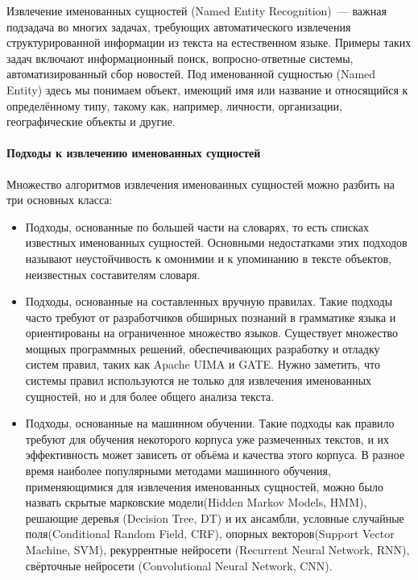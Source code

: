 \documentclass[14pt,russian]{extreport}
\begin{document}
Извлечение именованных сущностей\cite{nadeau2007survey} (Named Entity
Recognition)~--- важная подзадача во многих задачах, требующих автоматического
извлечения структурированной информации из текста на естественном
языке\cite{feldman2007text}. Примеры таких задач включают информационный поиск,
вопросно-ответные системы, автоматизированный сбор новостей. Под именованной
сущностью (Named Entity) здесь мы понимаем объект, имеющий имя или название и
относящийся к определённому типу, такому как, например, личности, организации,
географические объекты и другие.

\paragraph{Подходы к извлечению именованных сущностей}

Множество алгоритмов извлечения именованных сущностей можно разбить на три
основных класса:
\begin{itemize}
  \item Подходы, основанные по большей части на словарях, то есть списках
    известных именованных сущностей. Основными недостатками этих подходов
    называют неустойчивость к омонимии и к упоминанию в тексте объектов,
    неизвестных составителям словаря.
  \item Подходы, основанные на составленных вручную правилах. Такие подходы
    часто требуют от разработчиков обширных познаний в грамматике языка и
    ориентированы на ограниченное множество языков. Существует множество мощных
    программных решений, обеспечивающих разработку и отладку систем правил,
    таких как Apache UIMA\cite{uima,uima-ruta} и GATE\cite{Cunningham2010}. Нужно заметить, что системы правил
    используются не только для извлечения именованных сущностей, но и для более
    общего анализа текста.
  \item Подходы, основанные на машинном обучении. Такие подходы как правило
    требуют для обучения некоторого корпуса уже размеченных текстов, и их
    эффективность может зависеть от объёма и качества этого корпуса. В разное
    время наиболее популярными методами машинного обучения, применяющимися для
    извлечения именованных сущностей, можно было назвать скрытые марковские
модели(Hidden Markov Models, HMM)\cite{mccallum2000maximum}, решающие деревья
(Decision Tree, DT)\cite{szarvas2006multilingual} и их ансамбли, условные
случайные поля(Conditional Random Field, CRF)\cite{crfusage}, опорных
векторов(Support Vector Machine, SVM)\cite{isozaki2002efficient}, рекуррентные
нейросети (Recurrent Neural Network, RNN)\cite{li2015biomedical}, свёрточные
нейросети (Convolutional
Neural Network, CNN)\cite{chiu2015named}.
\end{itemize}
\end{document}

